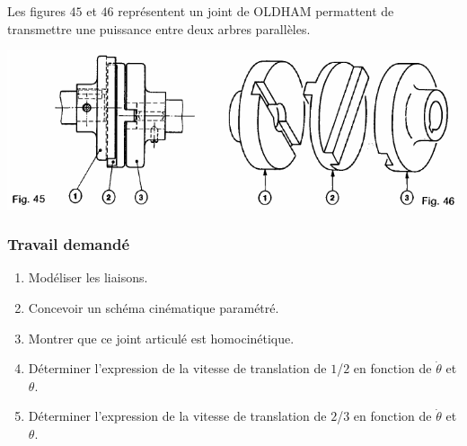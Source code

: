 Les figures $45$ et $46$ représentent un joint de OLDHAM permattent de transmettre une puissance entre deux arbres parallèles.
\begin{center}
    \includegraphics[scale=0.6]{png/joint.png}
\end{center}

\subsubsection{Travail demandé}
\begin{enumerate}
\item Modéliser les liaisons.
\item Concevoir un schéma cinématique paramétré.
\item Montrer que ce joint articulé est homocinétique.
\item Déterminer l'expression de la vitesse de translation de $1$/$2$ en fonction de $\dot{\theta}$ et $\theta$.
\item Déterminer l'expression de la vitesse de translation de $2$/$3$ en fonction de $\dot{\theta}$ et $\theta$.
\end{enumerate}

